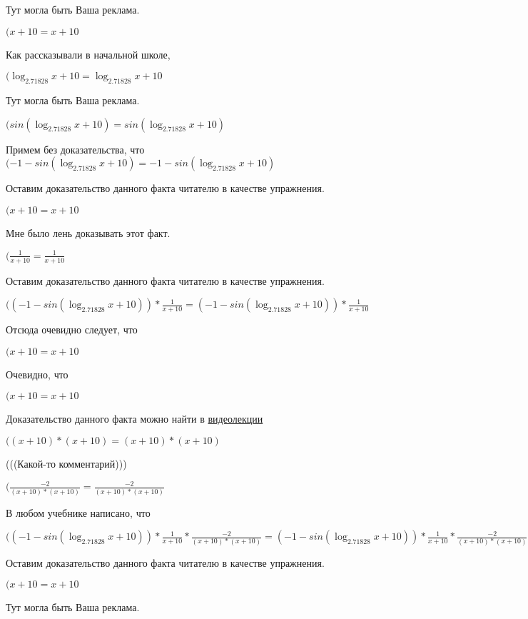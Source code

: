 \documentclass[12pt,a4paper,fleqn]{article}
\theoremstyle{definition}
\begin{document}
Тут могла быть Ваша реклама.

$( x  +  10  =  x  +  10 $

Как рассказывали в начальной школе,

$(\log_{ 2.71828 }{ x  +  10 } = \log_{ 2.71828 }{ x  +  10 }$

Тут могла быть Ваша реклама.

$(sin(\log_{ 2.71828 }{ x  +  10 }) = sin(\log_{ 2.71828 }{ x  +  10 })$

Примем без доказательства, что
$( -1  - sin(\log_{ 2.71828 }{ x  +  10 }) =  -1  - sin(\log_{ 2.71828 }{ x  +  10 })$

Оставим доказательство данного факта читателю в качестве упражнения.

$( x  +  10  =  x  +  10 $

Мне было лень доказывать этот факт.

$(\frac{ 1 }{ x  +  10 }
 = \frac{ 1 }{ x  +  10 }
$

Оставим доказательство данного факта читателю в качестве упражнения.

$(( -1  - sin(\log_{ 2.71828 }{ x  +  10 })) * \frac{ 1 }{ x  +  10 }
 = ( -1  - sin(\log_{ 2.71828 }{ x  +  10 })) * \frac{ 1 }{ x  +  10 }
$

Отсюда очевидно следует, что

$( x  +  10  =  x  +  10 $

Очевидно, что

$( x  +  10  =  x  +  10 $

Доказательство данного факта можно найти в \href{https://www.youtube.com/watch?v=dQw4w9WgXcQ}{видеолекции}

$(( x  +  10 ) * ( x  +  10 ) = ( x  +  10 ) * ( x  +  10 )$

(((Какой-то комментарий)))

$(\frac{ -2 }{( x  +  10 ) * ( x  +  10 )}
 = \frac{ -2 }{( x  +  10 ) * ( x  +  10 )}
$

В любом учебнике написано, что

$(( -1  - sin(\log_{ 2.71828 }{ x  +  10 })) * \frac{ 1 }{ x  +  10 }
 * \frac{ -2 }{( x  +  10 ) * ( x  +  10 )}
 = ( -1  - sin(\log_{ 2.71828 }{ x  +  10 })) * \frac{ 1 }{ x  +  10 }
 * \frac{ -2 }{( x  +  10 ) * ( x  +  10 )}
$

Оставим доказательство данного факта читателю в качестве упражнения.

$( x  +  10  =  x  +  10 $

Тут могла быть Ваша реклама.
\end{document}
